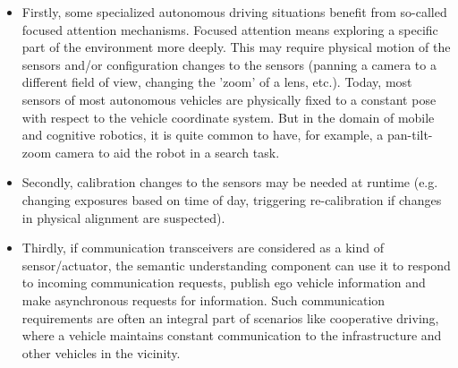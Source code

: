 \begin{itemize}
\item  Firstly, some specialized autonomous driving situations benefit from so-called focused attention mechanisms. Focused
attention means exploring a specific part of the environment more deeply. This may require physical motion of the sensors and/or configuration changes to the sensors (panning a
camera to a different field of view, changing the ’zoom’ of a lens, etc.). Today, most sensors of most autonomous vehicles are physically fixed to a constant pose with respect to the vehicle coordinate system. But in the domain of mobile
and cognitive robotics, it is quite common to have, for example, a pan-tilt-zoom camera to aid the robot in a search task. 
\item  Secondly, calibration changes to the sensors may be needed at runtime (e.g. changing exposures based on time of day, triggering re-calibration if changes in physical alignment are suspected). 
\item Thirdly, if communication transceivers are considered as a kind of sensor/actuator, the semantic understanding component can use it to respond to incoming communication requests, publish ego vehicle information and make asynchronous requests for information. Such communication requirements are often an integral part of scenarios like cooperative driving, where a vehicle maintains constant communication to the infrastructure and other vehicles in the vicinity.
\end{itemize}






